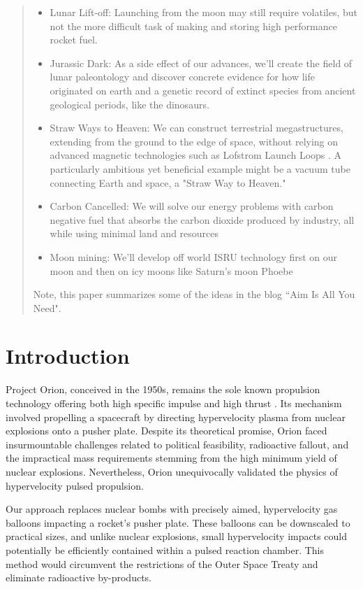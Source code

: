 \documentclass{article}
\begin{document}
\begin{abstract}
\begin{itemize}
 \item Lunar Lift-off: Launching from the moon may still require volatiles, but not the more difficult task of making and storing high performance rocket fuel.
  \item Jurassic Dark: As a side effect of our advances, we'll create the field of lunar paleontology and discover concrete evidence for how life originated on earth and a genetic record of extinct species from ancient geological periods, like the dinosaurs. 
  \item Straw Ways to Heaven:   We can construct terrestrial megastructures, extending from the ground to the edge of space, without relying on advanced magnetic technologies such as Lofstrom Launch Loops \cite{lofstrom_loop}. A particularly ambitious yet beneficial example might be a vacuum tube connecting Earth and space, a "Straw Way to Heaven."
  \item Carbon Cancelled: We will solve our energy problems with carbon negative fuel that absorbs the carbon dioxide produced by industry, all while using minimal land and resources
  \item Moon mining:  We'll develop off world ISRU technology first on our moon and then on icy moons like Saturn's moon Phoebe
\end{itemize}
Note, this paper summarizes some of the ideas in the blog ``Aim Is All You Need"\cite{aim2024}.
\end{abstract}

\section{Introduction}
Project Orion, conceived in the 1950s, remains the sole known propulsion technology offering both high specific impulse and high thrust \cite{projorion}. Its mechanism involved propelling a spacecraft by directing hypervelocity plasma from nuclear explosions onto a pusher plate. Despite its theoretical promise, Orion faced insurmountable challenges related to political feasibility, radioactive fallout, and the impractical mass requirements stemming from the high minimum yield of nuclear explosions. Nevertheless, Orion unequivocally validated the physics of hypervelocity pulsed propulsion.

Our approach replaces nuclear bombs with precisely aimed, hypervelocity gas balloons impacting a rocket's pusher plate. These balloons can be downscaled to practical sizes, and unlike nuclear explosions, small hypervelocity impacts could potentially be efficiently contained within a pulsed reaction chamber. This method would circumvent the restrictions of the Outer Space Treaty \cite{outer_space_treaty} and eliminate radioactive by-products.
\end{document}
